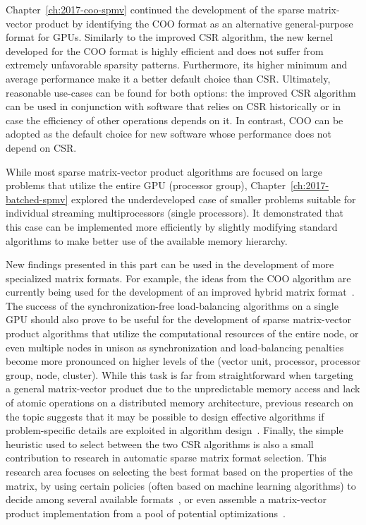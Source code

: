 Chapter~\ref{ch:2017-coo-spmv} continued the development of the sparse
matrix-vector product by identifying the COO format as an alternative
general-purpose format for GPUs. Similarly to the improved CSR algorithm, the
new kernel developed for the COO format is highly efficient and does not suffer
from extremely unfavorable sparsity patterns. Furthermore, its higher minimum
and average performance make it a better default choice than CSR. Ultimately,
reasonable use-cases can be found for both options: the improved CSR algorithm
can be used in conjunction with software that relies on CSR historically or in
case the efficiency of other operations depends on it. In contrast, COO can be
adopted as the default choice for new software whose performance does not depend
on CSR.

While most sparse matrix-vector product algorithms are focused on large
problems that utilize the entire GPU (processor group),
Chapter~\ref{ch:2017-batched-spmv} explored the underdeveloped case of smaller
problems suitable for individual streaming multiprocessors (single processors).
It demonstrated that this case can be implemented more efficiently by slightly
modifying standard algorithms to make better use of the available memory
hierarchy.

New findings presented in this part  can be used in the development of more
specialized matrix formats. For example, the ideas from the COO algorithm are
currently being used for the development of an improved hybrid matrix
format~\cite{hybrid}. The success of the synchronization-free load-balancing
algorithms on a single GPU should also prove to be useful for the development of
sparse matrix-vector product algorithms that utilize the computational resources
of the entire node, or even multiple nodes in unison as synchronization and
load-balancing penalties become more pronounced on higher levels of the
 (vector unit, processor, processor group, node,
cluster). While this task is far from straightforward when targeting a general
matrix-vector product due to the unpredictable memory access and lack of atomic
operations on a distributed memory architecture, previous research on the topic
suggests that it may be possible to design effective algorithms if
problem-specific details are exploited in algorithm
design~\cite{distributed-spmv}. Finally, the
simple heuristic used to select between the two CSR algorithms is also a small
contribution to research in automatic sparse matrix format selection. This
research area focuses on selecting the best format based on the properties of
the matrix, by using certain policies (often based on machine learning
algorithms) to decide among several available
formats~\cite{clspmv,gpu-selection}, or even assemble a matrix-vector product
implementation from a pool of potential optimizations~\cite{elafrou}.

